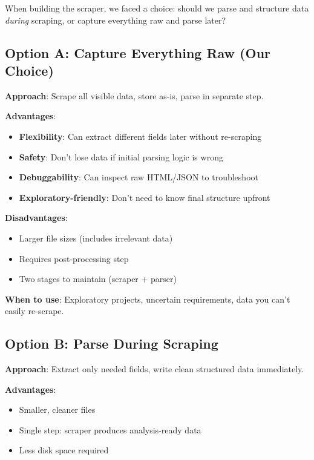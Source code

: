 \documentclass[11pt,a4paper]{article}
\begin{document}
When building the scraper, we faced a choice: should we parse and structure data \textit{during} scraping, or capture everything raw and parse later?

\subsection{Option A: Capture Everything Raw (Our Choice)}

\textbf{Approach}: Scrape all visible data, store as-is, parse in separate step.

\textbf{Advantages}:
\begin{itemize}
    \item \textbf{Flexibility}: Can extract different fields later without re-scraping
    \item \textbf{Safety}: Don't lose data if initial parsing logic is wrong
    \item \textbf{Debuggability}: Can inspect raw HTML/JSON to troubleshoot
    \item \textbf{Exploratory-friendly}: Don't need to know final structure upfront
\end{itemize}

\textbf{Disadvantages}:
\begin{itemize}
    \item Larger file sizes (includes irrelevant data)
    \item Requires post-processing step
    \item Two stages to maintain (scraper + parser)
\end{itemize}

\textbf{When to use}: Exploratory projects, uncertain requirements, data you can't easily re-scrape.

\subsection{Option B: Parse During Scraping}

\textbf{Approach}: Extract only needed fields, write clean structured data immediately.

\textbf{Advantages}:
\begin{itemize}
    \item Smaller, cleaner files
    \item Single step: scraper produces analysis-ready data
    \item Less disk space required
\end{itemize}
\end{document}
